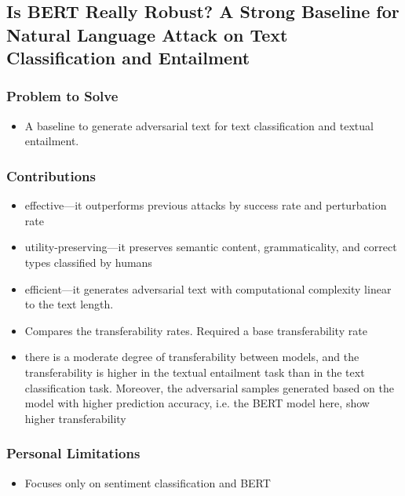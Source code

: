 \documentclass{article}
\begin{document}
\begin{flushleft}



\subsection{Is BERT Really Robust? A Strong Baseline for Natural Language Attack on Text Classification and Entailment  \cite{jin2020bert}} 
\subsubsection*{Problem to Solve}
\begin{itemize}
    \item A baseline to generate adversarial text for text classification and textual entailment.
\end{itemize}

\subsubsection*{Contributions}
\begin{itemize}
  \item effective—it outperforms previous attacks by success rate and perturbation rate
    \item utility-preserving—it preserves semantic content, grammaticality, and correct types classified by humans
  \item efficient—it generates adversarial text with computational complexity linear to the text length.
  \item Compares the transferability rates. Required a base transferability rate
  \item there is a moderate degree of transferability between models, and the transferability is higher in the textual entailment task than in the text classification task. Moreover, the adversarial samples generated based on the model with higher prediction accuracy, i.e. the BERT model here, show higher transferability
\end{itemize}


\subsubsection*{Personal Limitations}
\begin{itemize}
    \item Focuses only on sentiment classification and BERT
\end{itemize}




\end{flushleft}
\end{document}
